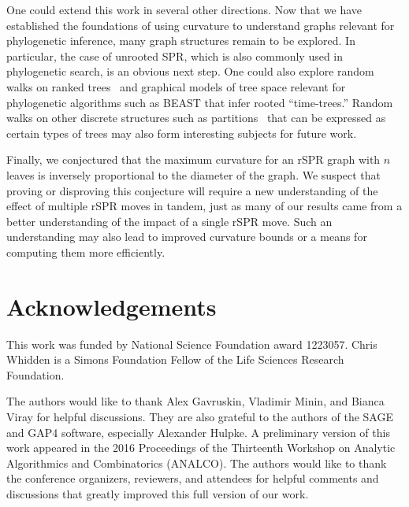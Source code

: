 \documentclass[]{elsarticle}
\begin{document}
One could extend this work in several other directions.
Now that we have established the foundations of using curvature to understand graphs relevant for phylogenetic inference, many graph structures remain to be explored.
In particular, the case of unrooted SPR, which is also commonly used in phylogenetic search, is an obvious next step.
One could also explore random walks on ranked trees~\citep{Song2006-xe} and graphical models of tree space relevant for phylogenetic algorithms such as BEAST \citep{Drummond2012-ek} that infer rooted ``time-trees.''
Random walks on other discrete structures such as partitions~\citep{Gusfield2002-il} that can be expressed as certain types of trees may also form interesting subjects for future work.

Finally, we conjectured that the maximum curvature for an rSPR graph with $n$ leaves is inversely proportional to the diameter of the graph.
We suspect that proving or disproving this conjecture will require a new understanding of the effect of multiple rSPR moves in tandem, just as many of our results came from a better understanding of the impact of a single rSPR move.
Such an understanding may also lead to improved curvature bounds or a means for computing them more efficiently.


\section{Acknowledgements}
This work was funded by National Science Foundation award 1223057.
Chris Whidden is a Simons Foundation Fellow of the Life Sciences Research Foundation.

The authors would like to thank Alex Gavruskin, Vladimir Minin, and Bianca Viray for helpful discussions.
They are also grateful to the authors of the SAGE and GAP4 software, especially Alexander Hulpke.
A preliminary version of this work appeared in the 2016 Proceedings of the Thirteenth Workshop on Analytic Algorithmics and Combinatorics (ANALCO).
The authors would like to thank the conference organizers, reviewers, and attendees for helpful comments and discussions that greatly improved this full version of our work.



\end{document}
